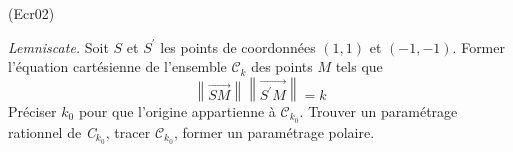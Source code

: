 \begin{tiny}(Ecr02)\end{tiny}
\emph{Lemniscate.} Soit $S$ et $S^{\prime }$ les points de coordonn{\'e}es $(1,1)$ et $(-1,-1)$. Former l'{\'e}quation
cart{\'e}sienne de l'ensemble $\mathcal C_{k}$ des points $M$ tels que
\[
\left\| \overrightarrow{SM}\right\| \left\| \overrightarrow{S^{\prime }M}\right\| =k
\]
Pr{\'e}ciser $k_{0}$ pour que l'origine appartienne {\`a} $\mathcal C_{k_{0}}$. Trouver un param{\'e}trage rationnel de \emph{C}$_{k_{0}}$, tracer $\mathcal C_{k_{0}}$, former un param{\'e}trage polaire.
